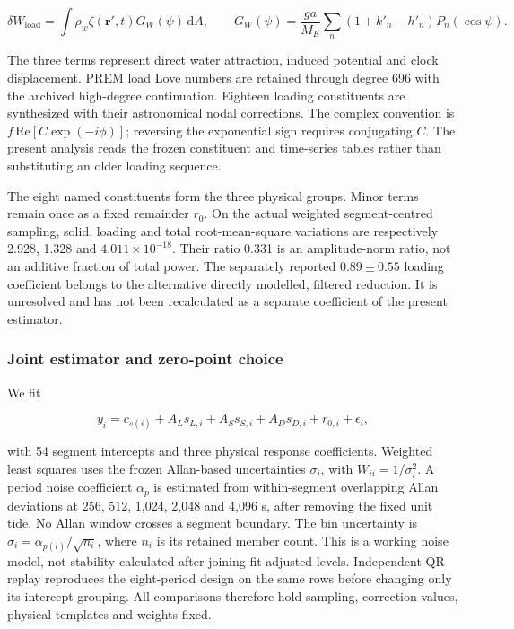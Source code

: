\documentclass[
  12pt,
  a4paper,
]{article}
\begin{document}
\[\delta W_{\mathrm{load}}=\int \rho_w\zeta(\mathbf{r}',t)G_W(\psi)\,\mathrm{d}A,\qquad
G_W(\psi)=\frac{ga}{M_E}\sum_n(1+k'_n-h'_n)P_n(\cos\psi).\]

The three terms represent direct water attraction, induced potential and
clock displacement. PREM load Love numbers are retained through degree
696 with the archived high-degree continuation. Eighteen loading
constituents are synthesized with their astronomical nodal corrections.
The complex convention is \(f\,\mathrm{Re}[C\exp(-i\phi)]\); reversing
the exponential sign requires conjugating \(C\). The present analysis
reads the frozen constituent and time-series tables rather than
substituting an older loading sequence.

The eight named constituents form the three physical groups. Minor terms
remain once as a fixed remainder \(r_0\). On the actual weighted
segment-centred sampling, solid, loading and total root-mean-square
variations are respectively 2.928, 1.328 and \(4.011\times10^{-18}\).
Their ratio 0.331 is an amplitude-norm ratio, not an additive fraction
of total power. The separately reported \(0.89\pm0.55\) loading
coefficient belongs to the alternative directly modelled, filtered
reduction. It is unresolved and has not been recalculated as a separate
coefficient of the present estimator.

\hypertarget{joint-estimator-and-zero-point-choice}{%
\subsubsection{Joint estimator and zero-point
choice}\label{joint-estimator-and-zero-point-choice}}

We fit

\[y_i=c_{s(i)}+A_Ls_{L,i}+A_Ss_{S,i}+A_Ds_{D,i}+r_{0,i}+\epsilon_i,\]

with 54 segment intercepts and three physical response coefficients.
Weighted least squares uses the frozen Allan-based uncertainties
\(\sigma_i\), with \(W_{ii}=1/\sigma_i^2\). A period noise coefficient
\(\alpha_p\) is estimated from within-segment overlapping Allan
deviations at 256, 512, 1,024, 2,048 and 4,096 s, after removing the
fixed unit tide. No Allan window crosses a segment boundary. The bin
uncertainty is \(\sigma_i=\alpha_{p(i)}/\sqrt{n_i}\), where \(n_i\) is
its retained member count. This is a working noise model, not stability
calculated after joining fit-adjusted levels. Independent QR replay
reproduces the eight-period design on the same rows before changing only
its intercept grouping. All comparisons therefore hold sampling,
correction values, physical templates and weights fixed.
\end{document}
